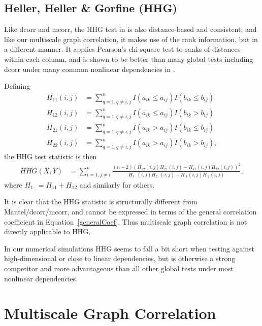 \documentclass[11pt]{article}
\begin{document}
\subsection{Heller, Heller \& Gorfine (HHG)}
\label{sec:hhg}
Like dcorr and mcorr, the HHG test in \cite{HellerGorfine2013} is also distance-based and consistent; and like our multiscale graph correlation, it makes use of the rank information, but in a different manner. It applies Pearson's chi-square test to ranks of distances within each column, and is shown to be better than many global tests including dcorr under many common nonlinear dependencies in \cite{GorfineHellerHeller2012, HellerGorfine2013}. 

Defining 
\begin{align*}
H_{11}(i,j) &= \sum_{q=1,q\neq i,j}^{n}I(a_{ik} \leq a_{ij})I(b_{ik} \leq b_{ij}) \\
H_{12}(i,j) &= \sum_{q=1,q\neq i,j}^{n}I(a_{ik} \leq a_{ij})I(b_{ik} > b_{ij}) \\
H_{21}(i,j) &= \sum_{q=1,q\neq i,j}^{n}I(a_{ik} > a_{ij})I(b_{ik} \leq b_{ij}) \\
H_{22}(i,j) &= \sum_{q=1,q\neq i,j}^{n}I(a_{ik} > a_{ij})I(b_{ik} > b_{ij}),
\end{align*}
the HHG test statistic is then
\begin{align*}
HHG(X,Y) &= \sum_{i=1,j\neq i}^{n} \frac{(n-2)(H_{12}(i,j)H_{21}(i,j)-H_{11}(i,j)H_{22}(i,j))^2}{H_{1 \cdot}(i,j)H_{2 \cdot}(i,j)-H_{\cdot 1}(i,j)H_{\cdot 2}(i,j)},
\end{align*}
where $H_{1 \cdot}=H_{11}+H_{12}$ and similarly for others.

It is clear that the HHG statistic is structurally different from Mantel/dcorr/mcorr, and cannot be expressed in terms of the general correlation coefficient in Equation~\ref{generalCoef}. Thus multiscale graph correlation is not directly applicable to HHG.

In our numerical simulations HHG seems to fall a bit short when testing against high-dimensional or close to linear dependencies, but is otherwise a strong competitor and more advantageous than all other global tests under most nonlinear dependencies. %

\section{Multiscale Graph Correlation}
\label{main2}
\end{document}
